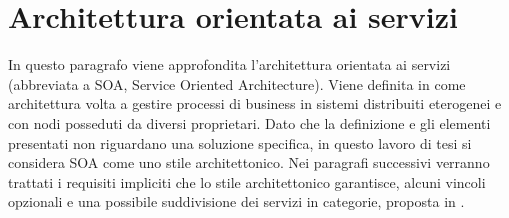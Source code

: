 \documentclass[a4paper,12pt]{report}
\begin{document}
\section{Architettura orientata ai servizi} \label{servizio}
In questo paragrafo viene approfondita l'architettura orientata ai servizi (abbreviata a SOA, Service Oriented Architecture).
Viene definita in \cite{josuttis_soa_2007} come architettura volta a gestire processi di business in sistemi distribuiti eterogenei e con nodi posseduti da diversi proprietari.
Dato che la definizione e gli elementi presentati non riguardano una soluzione specifica, in questo lavoro di tesi si considera SOA come uno stile architettonico.
Nei paragrafi successivi verranno trattati i requisiti impliciti che lo stile architettonico garantisce, alcuni vincoli opzionali e una possibile suddivisione dei servizi in categorie, proposta in \cite {josuttis_soa_2007}.
\end{document}

